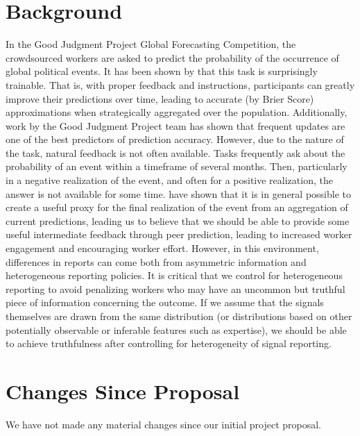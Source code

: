 \documentclass[a4paper, 11pt]{article}
\begin{document}
\section{Background}
In the Good Judgment Project Global Forecasting Competition, the crowdsourced workers are asked to predict the probability of the occurrence of global political events. It has been shown by \citet{ungar2012good} that this task is surprisingly trainable. That is, with proper feedback and instructions, participants can greatly improve their predictions over time, leading to accurate (by Brier Score) approximations when strategically aggregated over the population. Additionally, work by the Good Judgment Project team has shown that frequent updates are one of the best predictors of prediction accuracy. However, due to the nature of the task, natural feedback is not often available. Tasks frequently ask about the probability of an event within a timeframe of several months. Then, particularly in a negative realization of the event, and often for a positive realization, the answer is not available for some time. \citet{witkowski2017proper} have shown that it is in general possible to create a useful proxy for the final realization of the event from an aggregation of current predictions, leading us to believe that we should be able to provide some useful intermediate feedback through peer prediction, leading to increased worker engagement and encouraging worker effort. However, in this environment, differences in reports can come both from asymmetric information and heterogeneous reporting policies. It is critical that we control for heterogeneous reporting to avoid penalizing workers who may have an uncommon but truthful piece of information concerning the outcome. If we assume that the signals themselves are drawn from the same distribution (or distributions based on other potentially observable or inferable features such as expertise), we should be able to achieve truthfulness after controlling for heterogeneity of signal reporting. 

% 
\section{Changes Since Proposal}
We have not made any material changes since our initial project proposal.
\end{document}
